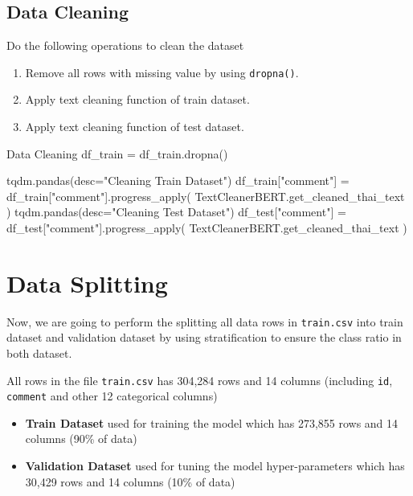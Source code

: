 \documentclass[12pt, a4paper]{article}
\begin{document}
            \subsection{Data Cleaning}
                Do the following operations to clean the dataset
                \begin{enumerate}
                    \item Remove all rows with missing value by using \texttt{dropna()}.
                    \item Apply text cleaning function of train dataset.
                    \item Apply text cleaning function of test dataset.
                \end{enumerate}

                \begin{codeblock}{Data Cleaning}
                    df_train = df_train.dropna()

                    tqdm.pandas(desc="Cleaning Train Dataset")
                    df_train["comment"] = df_train["comment"].progress_apply(
                        TextCleanerBERT.get_cleaned_thai_text
                    )
                    tqdm.pandas(desc="Cleaning Test Dataset")
                    df_test["comment"] = df_test["comment"].progress_apply(
                        TextCleanerBERT.get_cleaned_thai_text
                    )
                \end{codeblock}

    \pagebreak

        \section{Data Splitting}
            Now, we are going to perform the splitting all data rows in \texttt{train.csv} into train dataset
            and validation dataset by using stratification to ensure the class ratio in both dataset.

            \vspace{0.5em}

            All rows in the file \texttt{train.csv} has 304,284 rows and 14 columns
            (including \texttt{id}, \texttt{comment} and other 12 categorical columns)
            \begin{itemize}
                \item \textbf{Train Dataset} used for training the model which has 273,855 rows and 14 columns (90\% of data)
                \item \textbf{Validation Dataset} used for tuning the model hyper-parameters which has 30,429 rows and 14 columns (10\% of data)
            \end{itemize}
\end{document}
